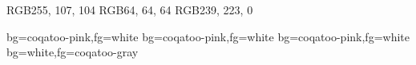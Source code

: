 

\definecolor{coqatoo-pink}      {RGB}{255, 107, 104}
\definecolor{coqatoo-gray}      {RGB}{64, 64, 64}
\definecolor{coqatoo-yellow}    {RGB}{239, 223, 0}

   {bg=coqatoo-pink,fg=white}
         {bg=coqatoo-pink,fg=white}
        {bg=coqatoo-pink,fg=white}
       {bg=white,fg=coqatoo-gray}